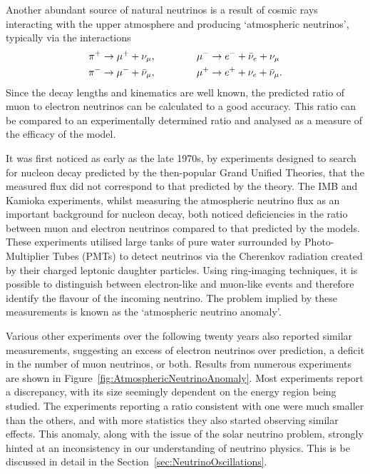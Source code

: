 Another abundant source of natural neutrinos is a result of cosmic rays interacting with the upper atmosphere and producing `atmospheric neutrinos', typically via the interactions \cite{Gaisser1990}
\begin{align}
  \pi^+ \rightarrow \mu^+ + \nu_{\mu}, &\hspace{1.5cm} \mu^- \rightarrow e^- + \bar{\nu}_e + \nu_{\mu} \\
  \pi^- \rightarrow \mu^- + \bar{\nu}_{\mu}, &\hspace{1.5cm} \mu^+ \rightarrow e^+ + \nu_e + \bar{\nu}_{\mu}.
\end{align}
Since the decay lengths and kinematics are well known, the predicted ratio of muon to electron neutrinos can be calculated to a good accuracy.  This ratio can be compared to an experimentally determined ratio and analysed as a measure of the efficacy of the model.

It was first noticed as early as the late 1970s, by experiments designed to search for nucleon decay predicted by the then-popular Grand Unified Theories, that the measured flux did not correspond to that predicted by the theory.  The IMB \cite{Haines1986} and Kamioka \cite{Hirata1988} experiments, whilst measuring the atmospheric neutrino flux as an important background for nucleon decay, both noticed deficiencies in the ratio between muon and electron neutrinos compared to that predicted by the models.  These experiments utilised large tanks of pure water surrounded by Photo-Multiplier Tubes (PMTs) to detect neutrinos via the Cherenkov radiation created by their charged leptonic daughter particles.  Using ring-imaging techniques, it is possible to distinguish between electron-like and muon-like events and therefore identify the flavour of the incoming neutrino.  The problem implied by these measurements is known as the `atmospheric neutrino anomaly'.

Various other experiments over the following twenty years also reported similar measurements, suggesting an excess of electron neutrinos over prediction, a deficit in the number of muon neutrinos, or both.  Results from numerous experiments are shown in Figure~\ref{fig:AtmosphericNeutrinoAnomaly}.  Most experiments report a discrepancy, with its size seemingly dependent on the energy region being studied.  The experiments reporting a ratio consistent with one were much smaller than the others, and with more statistics they also started observing similar effects.  This anomaly, along with the issue of the solar neutrino problem, strongly hinted at an inconsistency in our understanding of neutrino physics.  This is be discussed in detail in the Section~\ref{sec:NeutrinoOscillations}.

